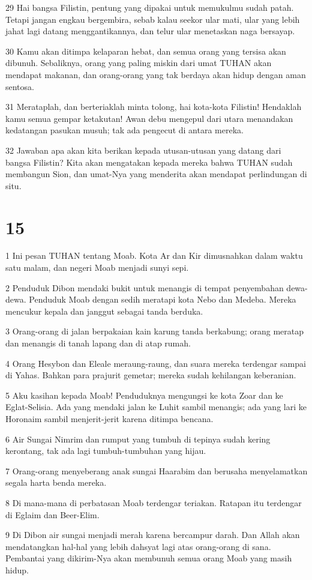 \par 29 Hai bangsa Filistin, pentung yang dipakai untuk memukulmu sudah patah. Tetapi jangan engkau bergembira, sebab kalau seekor ular mati, ular yang lebih jahat lagi datang menggantikannya, dan telur ular menetaskan naga bersayap.
\par 30 Kamu akan ditimpa kelaparan hebat, dan semua orang yang tersisa akan dibunuh. Sebaliknya, orang yang paling miskin dari umat TUHAN akan mendapat makanan, dan orang-orang yang tak berdaya akan hidup dengan aman sentosa.
\par 31 Merataplah, dan berteriaklah minta tolong, hai kota-kota Filistin! Hendaklah kamu semua gempar ketakutan! Awan debu mengepul dari utara menandakan kedatangan pasukan musuh; tak ada pengecut di antara mereka.
\par 32 Jawaban apa akan kita berikan kepada utusan-utusan yang datang dari bangsa Filistin? Kita akan mengatakan kepada mereka bahwa TUHAN sudah membangun Sion, dan umat-Nya yang menderita akan mendapat perlindungan di situ.

\chapter{15}

\par 1 Ini pesan TUHAN tentang Moab. Kota Ar dan Kir dimusnahkan dalam waktu satu malam, dan negeri Moab menjadi sunyi sepi.
\par 2 Penduduk Dibon mendaki bukit untuk menangis di tempat penyembahan dewa-dewa. Penduduk Moab dengan sedih meratapi kota Nebo dan Medeba. Mereka mencukur kepala dan janggut sebagai tanda berduka.
\par 3 Orang-orang di jalan berpakaian kain karung tanda berkabung; orang meratap dan menangis di tanah lapang dan di atap rumah.
\par 4 Orang Hesybon dan Eleale meraung-raung, dan suara mereka terdengar sampai di Yahas. Bahkan para prajurit gemetar; mereka sudah kehilangan keberanian.
\par 5 Aku kasihan kepada Moab! Penduduknya mengungsi ke kota Zoar dan ke Eglat-Selisia. Ada yang mendaki jalan ke Luhit sambil menangis; ada yang lari ke Horonaim sambil menjerit-jerit karena ditimpa bencana.
\par 6 Air Sungai Nimrim dan rumput yang tumbuh di tepinya sudah kering kerontang, tak ada lagi tumbuh-tumbuhan yang hijau.
\par 7 Orang-orang menyeberang anak sungai Haarabim dan berusaha menyelamatkan segala harta benda mereka.
\par 8 Di mana-mana di perbatasan Moab terdengar teriakan. Ratapan itu terdengar di Eglaim dan Beer-Elim.
\par 9 Di Dibon air sungai menjadi merah karena bercampur darah. Dan Allah akan mendatangkan hal-hal yang lebih dahsyat lagi atas orang-orang di sana. Pembantai yang dikirim-Nya akan membunuh semua orang Moab yang masih hidup.

